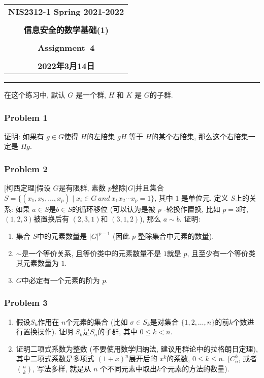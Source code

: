 \documentclass[a4paper,12pt]{ctexart}
\begin{document}
  \begin{center}

  \vspace{-0.3in}
  \begin{tabular}{c}
    \textbf{\Large NIS2312-1 Spring 2021-2022} \\
    \textbf{\Large  } \\
    \textbf{\Large  信息安全的数学基础(1)} \\
    \textbf{\Large  } \\
    \textbf{\Large  Assignment~4} \\
    \textbf{\Large  } \\
    \textbf{\Large 2022年3月14日} \\
  \end{tabular}
  \end{center}
  \noindent
  \rule{\linewidth}{0.4pt}

  在这个练习中, 默认 $G$ 是一个群, $H$ 和 $K$ 是 $ G $的子群.
\subsubsection*{Problem 1}
    证明: 如果有 $ g\in G $使得 $ H $的左陪集 $ gH $ 等于 $ H $的某个右陪集, 那么这个右陪集一定是 $ Hg $.
\subsubsection*{Problem 2}
    [柯西定理]假设 $ G $是有限群, 素数 $ p $整除$ \rvert G\lvert $并且集合 $ S=\{(x_1,x_2,\dots,x_p)\mid x_i\in G~and~x_1x_2\cdots x_p=1\} $, 其中 $ 1 $ 是单位元. 
    定义 $ S $上的关系: 如果 $ a\in S $是$ b\in S $的循环移位 (可以认为是被 $ p $ -轮换作置换, 比如 $ p=3 $时, $(1,2,3)$被置换后有 $ (2,3,1) $和 $ (3,1,2) $), 那么 $ a\sim b $.
    证明:
    \begin{enumerate}
      \item 集合 $ S $中的元素数量是 $ \rvert G\lvert^{p-1} $ (因此 $ p $ 整除集合中元素的数量).
      \item $ \sim $是一个等价关系, 且等价类中的元素数量不是 $ 1 $就是 $ p $, 且至少有一个等价类其元素数量为 $ 1 $.
      \item $ G $中必定有一个元素的阶为 $ p $.
    \end{enumerate}
\subsubsection*{Problem 3}
    \begin{enumerate}
      \item 假设$ S_k $作用在 $ n $个元素的集合 
      (比如 $ \sigma\in S_k $是对集合 $ \{1,2,\dots,n\} $的前$ k $个数进行置换操作). 
      证明 $ S_k $是$ S_n $的子群, 其中 $ 0\leq k<n $.
      \item 证明二项式系数为整数 (不要使用数学归纳法, 建议用群论中的拉格朗日定理), 
      其中二项式系数是多项式 $ (1+x)^n $展开后的 $ x^k $的系数, 
      $ 0\leq k\leq n $. ($ C_n^k $, 或者 $ \binom{n}{k} $, 写法多样, 
      就是从 $n$ 个不同元素中取出$k$个元素的方法的数量). 
    \end{enumerate}
\end{document}
